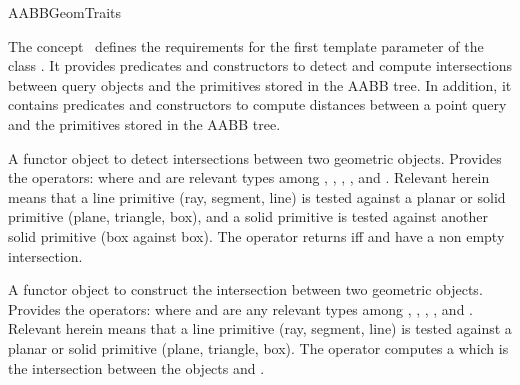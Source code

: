 \ccRefPageBegin


\begin{ccRefConcept}{AABBGeomTraits}


\ccDefinition
  
The concept \ccRefName\ defines the requirements for the first template parameter of the class . It provides predicates and constructors to detect and compute intersections between query objects and the primitives stored in the AABB tree. In addition, it contains  predicates and constructors to compute distances between a point query and the primitives stored in the AABB tree.

\ccTypes


{A functor object to detect intersections between two geometric objects.
Provides the operators:
where  and  are relevant types
among , , , ,  and . Relevant herein means that a line primitive (ray, segment, line) is tested against a planar or solid primitive (plane, triangle, box), and a solid primitive is tested against another solid primitive (box against box). The operator returns  iff  and  have a non empty intersection.}

{A functor object to construct the intersection between two geometric objects.
Provides the operators:
 where  and  are any relevant types among , , ,  ,  and . Relevant herein means that a line primitive (ray, segment, line) is tested against a planar or solid primitive (plane, triangle, box). The operator computes a  which is the intersection between the objects  and .}


\end{ccRefConcept}
